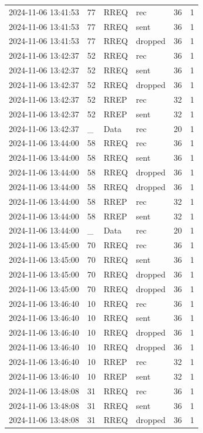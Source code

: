 \documentclass[]{nsm-thesis}
\begin{document}
\begin{longtable}{llllll}
2024-11-06 13:41:53 & 77 & RREQ & rec & 36 & 1 \\
2024-11-06 13:41:53 & 77 & RREQ & sent & 36 & 1 \\
2024-11-06 13:41:53 & 77 & RREQ & dropped & 36 & 1 \\
2024-11-06 13:42:37 & 52 & RREQ & rec & 36 & 1 \\
2024-11-06 13:42:37 & 52 & RREQ & sent & 36 & 1 \\
2024-11-06 13:42:37 & 52 & RREQ & dropped & 36 & 1 \\
2024-11-06 13:42:37 & 52 & RREP & rec & 32 & 1 \\
2024-11-06 13:42:37 & 52 & RREP & sent & 32 & 1 \\
2024-11-06 13:42:37 & _ & Data & rec & 20 & 1 \\
2024-11-06 13:44:00 & 58 & RREQ & rec & 36 & 1 \\
2024-11-06 13:44:00 & 58 & RREQ & sent & 36 & 1 \\
2024-11-06 13:44:00 & 58 & RREQ & dropped & 36 & 1 \\
2024-11-06 13:44:00 & 58 & RREQ & dropped & 36 & 1 \\
2024-11-06 13:44:00 & 58 & RREP & rec & 32 & 1 \\
2024-11-06 13:44:00 & 58 & RREP & sent & 32 & 1 \\
2024-11-06 13:44:00 & _ & Data & rec & 20 & 1 \\
2024-11-06 13:45:00 & 70 & RREQ & rec & 36 & 1 \\
2024-11-06 13:45:00 & 70 & RREQ & sent & 36 & 1 \\
2024-11-06 13:45:00 & 70 & RREQ & dropped & 36 & 1 \\
2024-11-06 13:45:00 & 70 & RREQ & dropped & 36 & 1 \\
2024-11-06 13:46:40 & 10 & RREQ & rec & 36 & 1 \\
2024-11-06 13:46:40 & 10 & RREQ & sent & 36 & 1 \\
2024-11-06 13:46:40 & 10 & RREQ & dropped & 36 & 1 \\
2024-11-06 13:46:40 & 10 & RREQ & dropped & 36 & 1 \\
2024-11-06 13:46:40 & 10 & RREP & rec & 32 & 1 \\
2024-11-06 13:46:40 & 10 & RREP & sent & 32 & 1 \\
2024-11-06 13:48:08 & 31 & RREQ & rec & 36 & 1 \\
2024-11-06 13:48:08 & 31 & RREQ & sent & 36 & 1 \\
2024-11-06 13:48:08 & 31 & RREQ & dropped & 36 & 1 \\

\end{longtable}
\end{document}
